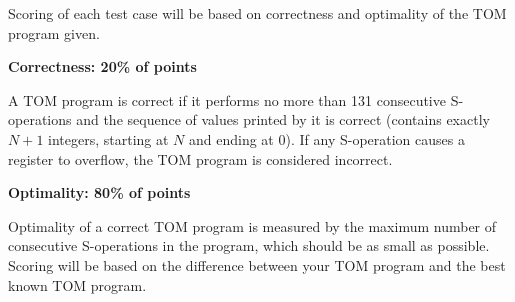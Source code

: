 Scoring of each test case will be based on correctness and optimality of the TOM program given.

\textbf{Correctness: 20\% of points}

A TOM program is correct if it performs no more than 131 consecutive S-operations and the sequence of values printed by it is correct (contains exactly $N+1$ integers, starting at $N$ and ending at $0$). If any S-operation causes a register to overflow, the TOM program is considered incorrect.

\textbf{Optimality: 80\% of points}

Optimality of a correct TOM program is measured by the maximum number of consecutive S-operations in the program, which should be as small as possible. Scoring will be based on the difference between your TOM program and the best known TOM program.